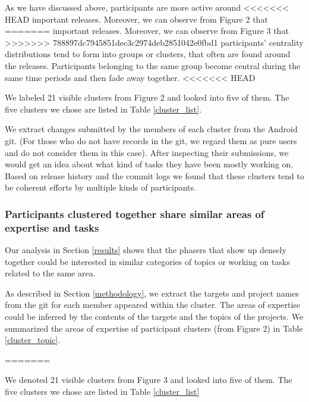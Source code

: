 \documentclass[conference]{IEEEtran}
\begin{document}
As we have discussed above, participants are more active around
<<<<<<< HEAD
important releases. Moreover, we can observe from Figure 2 that
=======
important releases. Moreover, we can observe from Figure 3 that
>>>>>>> 788897dc7945851dec3c2974deb2851042e0fbd1
participants' centrality distributions tend to form into groups or
clusters, that often
are found around the releases.
Participants belonging to the same group become central during
the same time periods and then fade away together.
<<<<<<< HEAD

We labeled 21 visible clusters from Figure 2 and looked into five of them. 
The five clusters we chose are listed in Table \ref{cluster_list}.

We extract changes submitted by the members of each cluster from the
Android git. (For those who do not have records in
the git, we regard them as pure users and do not
consider them in this case). After inspecting their submissions, we
would get an idea about what kind of tasks they have been mostly
working on.  
Based on release history and the commit logs we found 
that these clusters tend to be coherent efforts by multiple kinds of participants.




\subsubsection{Participants clustered together share similar areas of expertise and tasks}

Our analysis in Section \ref{results} shows that the phasers that show
up densely together could be interested in similar categories of
topics or working on tasks related to the same area.


As described in Section \ref{methodology}, we extract the targets and
project names from the git for each member appeared
within the cluster. The areas of expertise could be inferred by the contents
of the targets and the topics of the projects. We summarized the
areas of expertise of participant clusters (from Figure 2)
 in Table \ref{cluster_topic}.


=======

We denoted 21 visible clusters from Figure 3 and looked into five of them. 
The five clusters we chose are listed in Table \ref{cluster_list}
\end{document}
